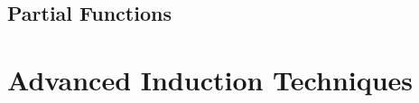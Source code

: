 \subsection{Partial Functions}



\section{Advanced Induction Techniques}
\label{sec:advanced-ind}


